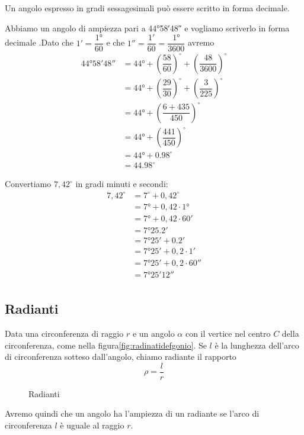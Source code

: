 Un angolo espresso in gradi sessagesimali può essere scritto in forma decimale. 
\begin{esempio}
 Abbiamo un angolo di ampiezza pari a \ang{44;58;48} e vogliamo scriverlo in forma decimale .Dato che $\ang{;1;}=\dfrac{\ang{1}}{60}$ e che $\ang{;;1}=\dfrac{\ang{;1;}}{60}=\dfrac{\ang{1}}{3600}$  avremo
\begin{align*}
	\ang{44;58;48}&=\ang{44}+\left(\dfrac{58}{60}\right)^{\circ}+\left(\dfrac{48}{3600} \right)^{\circ}\\
	&=\ang{44}+\left(\dfrac{29}{30}\right)^{\circ}+\left(\dfrac{3}{225} \right)^{\circ}\\
	&=\ang{44}+\left(\dfrac{6+435}{450} \right)^{\circ}\\
	&=\ang{44}+\left(\dfrac{441}{450} \right)^{\circ}\\
	&=\ang{44}+\num{0,98}^{\circ}\\
	&=\num{44,98}^{\circ}
\end{align*}
\end{esempio}
\begin{esempio}
Convertiamo $7,42^{\circ}$ in gradi minuti e secondi:
\begin{align*}
	7,42^{\circ}&=7^{\circ}+0,42^{\circ}\\
	&=\ang{7}+0,42\cdot \ang{1}\\
	&=\ang{7}+0,42\cdot \ang{;60;}\\
	&=\ang{7;25,2;}\\
	&=\ang{7;25;}+\ang{;0,2;}\\
	&=\ang{7;25;}+0,2\cdot\ang{;1;}\\
	&=\ang{7;25;}+0,2\cdot\ang{;;60}\\
	&=\ang{7;25;12}\\
\end{align*} 
\end{esempio}
\subsection{Radianti}
\begin{definizione}[Radiante]
Data una circonferenza di raggio $r$ e  un angolo $\alpha$ con il vertice nel centro $C$ della circonferenza, come nella figura\nobs\vref{fig:radinatidefgonio}. Se $l$ è la lunghezza dell'arco di circonferenza sotteso dall'angolo, chiamo radiante il rapporto \[\rho=\dfrac{l}{r} \]
\end{definizione}
\begin{figure}
	\centering
	
	\caption{Radianti}
	\label{fig:radinatidefgonio}
\end{figure}
Avremo quindi che un angolo ha l'ampiezza di un radiante se l'arco di circonferenza $l$ è uguale al raggio $r$.

